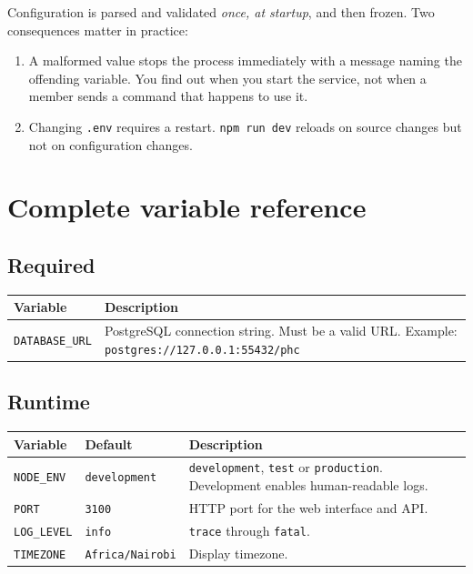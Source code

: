 \documentclass[11pt,a4paper]{report}
\begin{document}
Configuration is parsed and validated \emph{once, at startup}, and then frozen.
Two consequences matter in practice:

\begin{enumerate}
  \item A malformed value stops the process immediately with a message naming
        the offending variable. You find out when you start the service, not
        when a member sends a command that happens to use it.
  \item Changing \texttt{.env} requires a restart. \texttt{npm run dev} reloads
        on source changes but not on configuration changes.
\end{enumerate}

\section{Complete variable reference}

\subsection*{Required}

\begin{center}
\begin{tabularx}{\textwidth}{@{}lX@{}}
\toprule
\textbf{Variable} & \textbf{Description} \\
\midrule
\texttt{DATABASE\_URL} & PostgreSQL connection string. Must be a valid URL.
Example: \texttt{postgres://127.0.0.1:55432/phc} \\
\bottomrule
\end{tabularx}
\end{center}

\subsection*{Runtime}

\begin{center}
\begin{tabularx}{\textwidth}{@{}llX@{}}
\toprule
\textbf{Variable} & \textbf{Default} & \textbf{Description} \\
\midrule
\texttt{NODE\_ENV} & \texttt{development} & \texttt{development}, \texttt{test}
or \texttt{production}. Development enables human-readable logs. \\
\texttt{PORT} & \texttt{3100} & HTTP port for the web interface and API. \\
\texttt{LOG\_LEVEL} & \texttt{info} & \texttt{trace} through \texttt{fatal}. \\
\texttt{TIMEZONE} & \texttt{Africa/Nairobi} & Display timezone. \\
\bottomrule
\end{tabularx}
\end{center}
\end{document}
